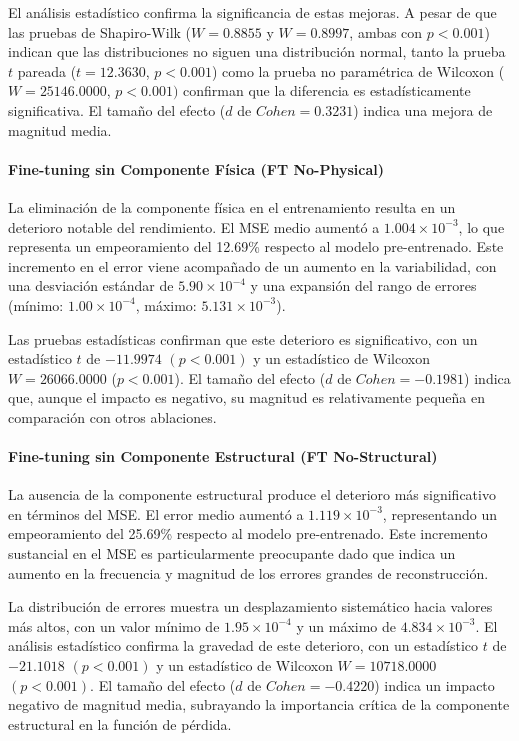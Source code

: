 El análisis estadístico confirma la significancia de estas mejoras. A pesar de que las pruebas de Shapiro-Wilk ($W = 0.8855$ y $W = 0.8997$, ambas con $p < 0.001$) indican que las distribuciones no siguen una distribución normal, tanto la prueba $t$ pareada ($t = 12.3630$, $p < 0.001$) como la prueba no paramétrica de Wilcoxon ($W = 25146.0000$, $p < 0.001)$ confirman que la diferencia es estadísticamente significativa. El tamaño del efecto ($d$ de $Cohen = 0.3231$) indica una mejora de magnitud media.

\paragraph{Fine-tuning sin Componente Física (FT No-Physical)}
La eliminación de la componente física en el entrenamiento resulta en un deterioro notable del rendimiento. El MSE medio aumentó a $1.004 \times 10^{-3}$, lo que representa un empeoramiento del 12.69\% respecto al modelo pre-entrenado. Este incremento en el error viene acompañado de un aumento en la variabilidad, con una desviación estándar de $5.90 \times 10^{-4}$ y una expansión del rango de errores (mínimo: $1.00 \times 10^{-4}$, máximo: $5.131 \times 10^{-3}$).

Las pruebas estadísticas confirman que este deterioro es significativo, con un estadístico $t$ de $-11.9974$ $(p < 0.001)$ y un estadístico de Wilcoxon $W = 26066.0000$ ($p < 0.001$). El tamaño del efecto ($d$ de $Cohen = -0.1981$) indica que, aunque el impacto es negativo, su magnitud es relativamente pequeña en comparación con otros ablaciones.

\paragraph{Fine-tuning sin Componente Estructural (FT No-Structural)}
La ausencia de la componente estructural produce el deterioro más significativo en términos del MSE. El error medio aumentó a $1.119 \times 10^{-3}$, representando un empeoramiento del 25.69\% respecto al modelo pre-entrenado. Este incremento sustancial en el MSE es particularmente preocupante dado que indica un aumento en la frecuencia y magnitud de los errores grandes de reconstrucción.

La distribución de errores muestra un desplazamiento sistemático hacia valores más altos, con un valor mínimo de $1.95 \times 10^{-4}$ y un máximo de $4.834 \times 10^{-3}$. El análisis estadístico confirma la gravedad de este deterioro, con un estadístico $t$ de $-21.1018$ $(p < 0.001)$ y un estadístico de Wilcoxon $W = 10718.0000$ $(p < 0.001)$. El tamaño del efecto ($d$ de $Cohen = -0.4220$) indica un impacto negativo de magnitud media, subrayando la importancia crítica de la componente estructural en la función de pérdida.

